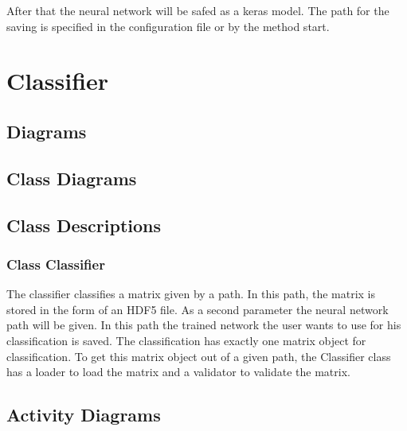 \documentclass[parskip=full]{scrartcl}
\begin{document}
After that the \gls{neural network} will be safed as a keras model.
The path for the saving is specified in the configuration file or by the method start.


\newpage
\section{Classifier}

\subsection{Diagrams}

\subsection{Class Diagrams}

\begin{figure}[h]
\begin{center}

\label{Class Diagram}
\end{center}
\end{figure}

\newpage


\subsection{Class Descriptions}

\subsubsection{Class Classifier}
The classifier classifies a matrix given by a path. 
In this path, the matrix is stored in the form of an HDF5 file.
As a second parameter the neural network path will be given. 
In this path the trained network the user wants to use for his classification is saved.
The classification has exactly one matrix object for classification. 
To get this matrix object out of a given path, the Classifier class has a loader to load the matrix and a validator to validate the matrix.

\newpage
 
\subsection{Activity Diagrams}
\end{document}

